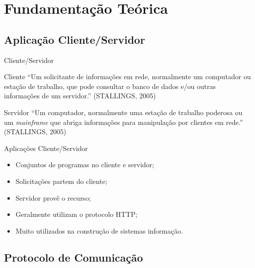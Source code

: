 \section{Fundamentação Teórica}\label{sec:fundamentacao-teorica}

\subsection{Aplicação Cliente/Servidor}

\begin{frame}{Cliente/Servidor}
	\begin{block}{Cliente}
		``Um solicitante de informações em rede, normalmente um computador ou 
		estação de trabalho, que pode consultar o banco de dados e/ou outras 
		informações de um servidor.'' (STALLINGS, 2005)
	\end{block}
	\begin{block}{Servidor}
		``Um computador, normalmente uma estação de trabalho poderosa ou um 
		\textit{mainframe} que abriga informações para manipulação por clientes 
		em rede.'' (STALLINGS, 2005)
	\end{block}
\end{frame}
\begin{frame}{Aplicações Cliente/Servidor}
	\begin{itemize}
		\item Conjuntos de programas no cliente e servidor; \pause
		\item Solicitações partem do cliente; \pause
		\item Servidor provê o recurso; \pause
		\item Geralmente utilizam o protocolo HTTP; \pause
		\item Muito utilizados na construção de sistemas informação.
	\end{itemize}
\end{frame}

\subsection{Protocolo de Comunicação}

